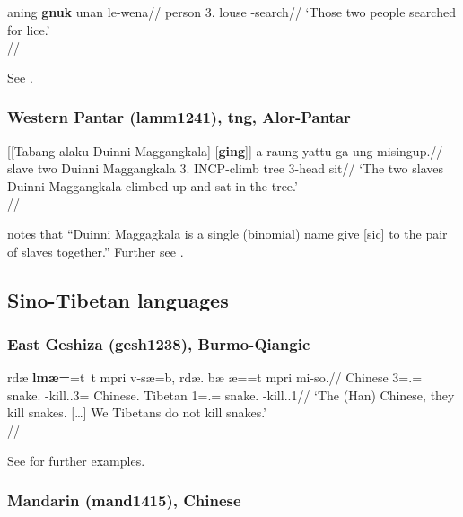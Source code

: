 \ex \begingl
\gla aning \textbf{gnuk} unan le-wena//
\glb person 3.\Du{} louse \Appl-search//
\glft `Those two people searched for lice.'\\\citep[472, (75)]{schapperhendery2014}//
\endgl
\xe

See \citet[472]{schapperhendery2014}.


\subsubsection{Western Pantar (lamm1241), \gls{tng}, Alor-Pantar}

\ex 
\begingl
\gla {}[[Tabang alaku Duinni Maggangkala] [\textbf{ging}]] a-raung yattu ga-ung misingup.//
\glb slave two Duinni Maggangkala 3\Pl.\Act{} INCP-climb tree 3\Sg-head sit//
\glft `The two slaves Duinni Maggangkala climbed up and sat in the tree.'\\\citep[53, (105)]{holton2014}//
\endgl
\xe 

\citet[53, fn. 3]{holton2014} notes that ``Duinni Maggagkala is a single (binomial) name give [sic] to the pair of slaves together.''
Further see \citet[53f.]{holton2014}.


\subsection{Sino-Tibetan languages}


\subsubsection{East Geshiza (gesh1238), Burmo-Qiangic} 

\ex 
\begingl
\gla rd\textctz{}\ae{} \textbf{lm\ae{}=\textltailn{}\textschwa}=t\textschwa~t\textschwa{} mpri v-s\ae{}=b\textopeno{}, rd\textctz{}\ae{}. b\ae{} \ng\ae{}=\textltailn{}\textschwa{}=t\textschwa{} mpri mi-so\ng{}.//
\glb Chinese 3=\Pl.\Abs{}=\Top~\Redup{} snake.\Abs{} \Inv-kill.\Npst.3=\Mod{} Chinese.\Abs{} Tibetan 1=\Pl.\Abs{}=\Top{} snake.\Abs{} \Neg{}-kill.\Npst.1\Pl{}//
\glft `The (Han) Chinese, they kill snakes. [\ldots] We Tibetans do not kill snakes.'\\\citep[480, (7.48)]{honkasalo2019}//
\endgl
\xe

See \citet[388, 400, 438, 480, 507, 646]{honkasalo2019} for further examples.

\subsubsection{Mandarin (mand1415), Chinese}


